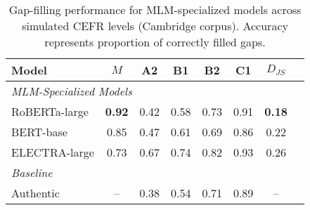 \begin{table}[ht]
\centering
\caption{Gap-filling performance for MLM-specialized models across simulated CEFR levels (Cambridge corpus). Accuracy represents proportion of correctly filled gaps.}
\label{tab:gap_filling_mlm}
\small
\begin{tabular}{lccccccc}
\toprule
\textbf{Model} & \textbf{$M$} & \textbf{A2} & \textbf{B1} & \textbf{B2} & \textbf{C1} & \textbf{$D_{JS}$} \\
\midrule
\multicolumn{7}{l}{\textit{MLM-Specialized Models}} \\
RoBERTa-large & \textbf{0.92} & 0.42 & 0.58 & 0.73 & 0.91 & \textbf{0.18} \\
BERT-base & 0.85 & 0.47 & 0.61 & 0.69 & 0.86 & 0.22 \\
ELECTRA-large & 0.73 & 0.67 & 0.74 & 0.82 & 0.93 & 0.26 \\
\midrule
\multicolumn{7}{l}{\textit{Baseline}} \\
Authentic & -- & 0.38 & 0.54 & 0.71 & 0.89 & -- \\
\bottomrule
\end{tabular}
\end{table}
